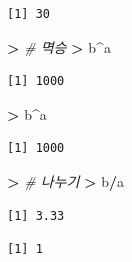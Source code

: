 \documentclass[12pt,a4paper]{book}
\newenvironment{Shaded}{\begin{snugshade}}{\end{snugshade}}
\newcommand{\StringTok}[1]{\textcolor[rgb]{0.31,0.60,0.02}{#1}}
\newcommand{\CommentTok}[1]{\textcolor[rgb]{0.56,0.35,0.01}{\textit{#1}}}
\newcommand{\OperatorTok}[1]{\textcolor[rgb]{0.81,0.36,0.00}{\textbf{#1}}}
\newcommand{\ErrorTok}[1]{\textcolor[rgb]{0.64,0.00,0.00}{\textbf{#1}}}
\newcommand{\NormalTok}[1]{#1}
\theoremstyle{definition}
\theoremstyle{definition}
\theoremstyle{definition}
\theoremstyle{remark}
\begin{document}
\begin{verbatim}
[1] 30
\end{verbatim}

\begin{Shaded}
\begin{Highlighting}[]
\OperatorTok{>}\StringTok{ }\CommentTok{# 멱승}
\ErrorTok{>}\StringTok{ }\NormalTok{b}\OperatorTok{^}\NormalTok{a}
\end{Highlighting}
\end{Shaded}

\begin{verbatim}
[1] 1000
\end{verbatim}

\begin{Shaded}
\begin{Highlighting}[]
\OperatorTok{>}\StringTok{ }\NormalTok{b}\OperatorTok{^}\NormalTok{a}
\end{Highlighting}
\end{Shaded}

\begin{verbatim}
[1] 1000
\end{verbatim}

\begin{Shaded}
\begin{Highlighting}[]
\OperatorTok{>}\StringTok{ }\CommentTok{# 나누기}
\ErrorTok{>}\StringTok{ }\NormalTok{b}\OperatorTok{/}\NormalTok{a}
\end{Highlighting}
\end{Shaded}

\begin{verbatim}
[1] 3.33
\end{verbatim}

\begin{Shaded}
\end{Shaded}

\begin{verbatim}
[1] 1
\end{verbatim}

\begin{Shaded}
\end{Shaded}
\end{document}
